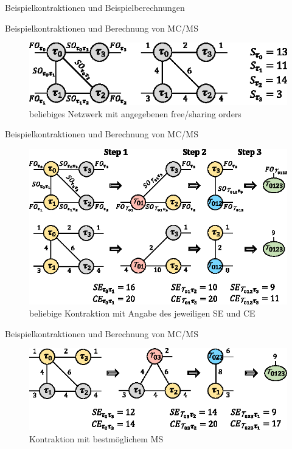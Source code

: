 \documentclass{beamer}
\begin{document}
	\begin{section}{Beispielkontraktionen und Beispielberechnungen}
	
		\begin{frame}{Beispielkontraktionen und Berechnung von MC/MS}
			\begin{figure}
				\includegraphics{figure_03_a}
				\caption{beliebiges Netzwerk mit angegebenen free/sharing orders}
			\end{figure}
		\end{frame}

		\begin{frame}{Beispielkontraktionen und Berechnung von MC/MS}
			\begin{figure}
				\includegraphics{figure_03_b}
				\caption{beliebige Kontraktion mit Angabe des jeweiligen SE und CE}
			\end{figure}
		\end{frame}

		\begin{frame}{Beispielkontraktionen und Berechnung von MC/MS}
			\begin{figure}
				\includegraphics{figure_03_c}
				\caption{Kontraktion mit bestmöglichem MS}
			\end{figure}
		\end{frame}


\end{section}
\end{document}
